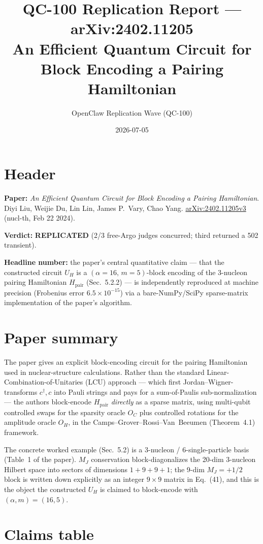\documentclass[11pt]{article}
\title{QC-100 Replication Report --- arXiv:2402.11205\\
\large An Efficient Quantum Circuit for Block Encoding a Pairing Hamiltonian}
\author{OpenClaw Replication Wave (QC-100)}
\date{2026-07-05}
\begin{document}
\maketitle

\section*{Header}
\textbf{Paper:} \emph{An Efficient Quantum Circuit for Block Encoding a Pairing
Hamiltonian}. Diyi Liu, Weijie Du, Lin Lin, James P.\ Vary, Chao Yang.
\href{https://arxiv.org/abs/2402.11205}{arXiv:2402.11205v3} (nucl-th, Feb 22 2024).

\textbf{Verdict:} \textcolor{green!50!black}{\textbf{REPLICATED}} (2/3 free-Argo
judges concurred; third returned a 502 transient).

\textbf{Headline number:} the paper's central quantitative claim --- that the
constructed circuit $U_H$ is a $(\alpha{=}16,\,m{=}5)$-block encoding of the
3-nucleon pairing Hamiltonian $H_{\text{pair}}$ (Sec.~5.2.2) --- is
independently reproduced at machine precision (Frobenius error
$6.5\times 10^{-15}$) via a bare-NumPy/SciPy sparse-matrix implementation of the
paper's algorithm.

\section{Paper summary}

The paper gives an explicit block-encoding circuit for the pairing Hamiltonian
used in nuclear-structure calculations. Rather than the standard
Linear-Combination-of-Unitaries (LCU) approach --- which first Jordan--Wigner-
transforms $c^\dagger,c$ into Pauli strings and pays for a sum-of-Paulis
sub-normalization --- the authors block-encode $H_{\text{pair}}$ \emph{directly}
as a sparse matrix, using multi-qubit controlled swaps for the sparsity oracle
$O_C$ plus controlled rotations for the amplitude oracle $O_H$, in the
Camps--Grover--Rossi--Van~Beeumen (Theorem~4.1) framework.

The concrete worked example (Sec.~5.2) is a 3-nucleon / 6-single-particle basis
(Table~1 of the paper). $M_J$ conservation block-diagonalizes the 20-dim
3-nucleon Hilbert space into sectors of dimensions $1{+}9{+}9{+}1$; the 9-dim
$M_J=+1/2$ block is written down explicitly as an integer $9\times 9$ matrix in
Eq.~(41), and this is the object the constructed $U_H$ is claimed to
block-encode with $(\alpha,m)=(16,5)$.

\section{Claims table}
\end{document}
